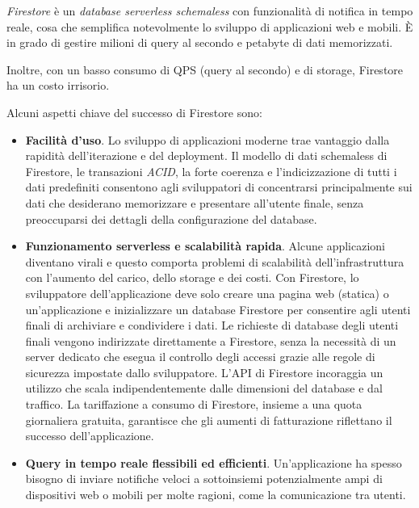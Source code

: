 \textit{Firestore} è un \textit{database serverless schemaless} con funzionalità di notifica in tempo reale, cosa che semplifica notevolmente lo sviluppo di applicazioni web e mobili. È in grado di gestire milioni di query al secondo e petabyte di dati memorizzati.

Inoltre, con un basso consumo di QPS (query al secondo) e di storage, Firestore ha un costo irrisorio.

Alcuni aspetti chiave del successo di Firestore sono\cite{kesavan2023firestore}:
\begin{itemize}
    \item \textbf{Facilità d'uso}. Lo sviluppo di applicazioni moderne trae vantaggio dalla rapidità dell'iterazione e del deployment. Il modello di dati schemaless di Firestore, le transazioni \textit{ACID}, la forte coerenza e l'indicizzazione di tutti i dati predefiniti consentono agli sviluppatori di concentrarsi principalmente sui dati che desiderano memorizzare e presentare all'utente finale, senza preoccuparsi dei dettagli della configurazione del database.
    \item \textbf{Funzionamento serverless e scalabilità rapida}. Alcune applicazioni diventano virali e questo comporta problemi di scalabilità dell'infrastruttura con l'aumento del carico, dello storage e dei costi. Con Firestore, lo sviluppatore dell'applicazione deve solo creare una pagina web (statica) o un'applicazione e inizializzare un database Firestore per consentire agli utenti finali di archiviare e condividere i dati. Le richieste di database degli utenti finali vengono indirizzate direttamente a Firestore, senza la necessità di un server dedicato che esegua il controllo degli accessi grazie alle regole di sicurezza impostate dallo sviluppatore. L'API di Firestore incoraggia un utilizzo che scala indipendentemente dalle dimensioni del database e dal traffico.
    La tariffazione a consumo di Firestore, insieme a una quota giornaliera gratuita, garantisce che gli aumenti di fatturazione riflettano il successo dell'applicazione.
    \item \textbf{Query in tempo reale flessibili ed efficienti}. Un'applicazione ha spesso bisogno di inviare notifiche veloci a sottoinsiemi potenzialmente ampi di dispositivi web o mobili per molte ragioni, come la comunicazione tra utenti.
\end{itemize}
